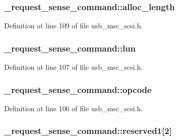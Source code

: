 \subsubsection[{\texorpdfstring{alloc\+\_\+length}{alloc_length}}]{ \+\_\+request\+\_\+sense\+\_\+command\+::alloc\+\_\+length}\hypertarget{struct__request__sense__command_a2ff1f279766606fce953063ffbfad20f}{}\label{struct__request__sense__command_a2ff1f279766606fce953063ffbfad20f}


Definition at line 109 of file usb\+\_\+msc\+\_\+scsi.\+h.

\subsubsection[{\texorpdfstring{lun}{lun}}]{ \+\_\+request\+\_\+sense\+\_\+command\+::lun}\hypertarget{struct__request__sense__command_aaaf6819df56a403fa0019bc42e9ac879}{}\label{struct__request__sense__command_aaaf6819df56a403fa0019bc42e9ac879}


Definition at line 107 of file usb\+\_\+msc\+\_\+scsi.\+h.

\subsubsection[{\texorpdfstring{opcode}{opcode}}]{ \+\_\+request\+\_\+sense\+\_\+command\+::opcode}\hypertarget{struct__request__sense__command_ade05b660b81d65777a966c1c4ed39197}{}\label{struct__request__sense__command_ade05b660b81d65777a966c1c4ed39197}


Definition at line 106 of file usb\+\_\+msc\+\_\+scsi.\+h.

\subsubsection[{\texorpdfstring{reserved1}{reserved1}}]{ \+\_\+request\+\_\+sense\+\_\+command\+::reserved1\mbox{[}2\mbox{]}}\hypertarget{struct__request__sense__command_a8921439cc33219ed7869defdca0ce7e6}{}\label{struct__request__sense__command_a8921439cc33219ed7869defdca0ce7e6}


